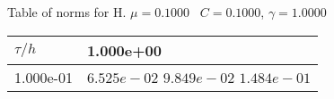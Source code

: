 \begin{center}
Table of norms for H. $\mu = 0.1000$ \, $C = 0.1000$, $\gamma = 1.0000$
  
\begin{tabular}{|p{1in}|p{1in}|} \hline
$\tau / h$ &1.000e+00 \\ \hline 
1.000e-01 & $6.525e-02$  $9.849e-02$  $1.484e-01$  \\ \hline 

\end{tabular}\\[20pt]
\end{center}
